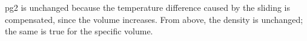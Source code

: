 pg2 is unchanged because the temperature difference caused by the sliding is compensated, since the volume increases. From above, the density is unchanged; the same is true for the specific volume.